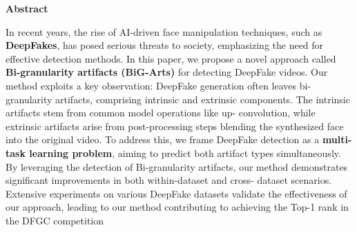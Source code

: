 \begin{center}
    \Large\textbf{Abstract}
    
\end{center}

\vspace{1cm}

\large

\vspace{1.5 cm}
In recent years, the rise of AI-driven face manipulation techniques, such as
\textbf{DeepFakes}, has posed serious threats to society, emphasizing the need
for effective detection methods. In this paper, we propose a novel
approach called \textbf{Bi-granularity artifacts (BiG-Arts)} for detecting DeepFake
videos. Our method exploits a key observation: DeepFake generation often
leaves bi-granularity artifacts, comprising intrinsic and extrinsic
components.
\vspace{1.0cm}
The intrinsic artifacts stem from common model operations like up-
convolution, while extrinsic artifacts arise from post-processing steps
blending the synthesized face into the original video. To address this, we
frame DeepFake detection as a \textbf{multi-task learning problem}, aiming to
predict both artifact types simultaneously.
\vspace{1.0cm}
By leveraging the detection of Bi-granularity artifacts, our method
demonstrates significant improvements in both within-dataset and cross-
dataset scenarios. Extensive experiments on various DeepFake datasets
validate the effectiveness of our approach, leading to our method
contributing to achieving the Top-1 rank in the DFGC competition